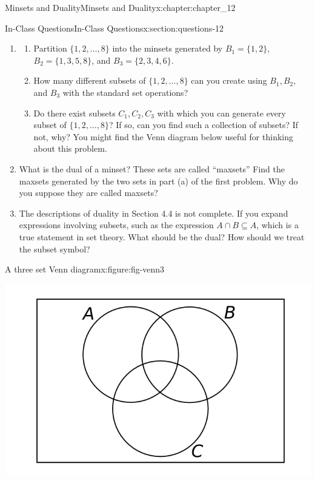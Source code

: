 \documentclass[oneside,10pt,]{book}
\numberwithin{equation}{section}
\begin{document}
\begin{chapterptx}{Minsets and Duality}{}{Minsets and Duality}{}{}{x:chapter:chapter_12}
\begin{sectionptx}{In-Class Questions}{}{In-Class Questions}{}{}{x:section:questions-12}
\begin{enumerate}[label=\arabic*.]
\begin{enumerate}[label=(\alph*)]
\item{}How does this notation make help us see how many distinct  minsets there could be that are generated by \(k\) subsets of a universe.%
\end{enumerate}
%
\item{}%
\begin{enumerate}[label=(\alph*)]
\item{}Partition \(\{1, 2,  \dots, 8\}\) into the minsets generated by \(B_1= \{1, 2\}\), \(B_2 = \{1, 3, 5, 8\}\), and \(B_3 = \{2, 3, 4, 6\}\).%
\item{}How many different subsets of \(\{1, 2, \dots ,8\}\) can you create using \(B_1, B_2\), and \(B_3\) with the standard set operations?%
\item{}Do there exist subsets \(C_1, C_2, C_3\) with which you can generate every subset of \(\{1,2, . . . ,8\}\)?  If so, can you find such a collection of subsets?  If not, why?  You might find the Venn diagram below useful for thinking about this problem.%
\end{enumerate}
%
\item{}What is the dual of a minset?  These sets are called ``maxsets''  Find the maxsets generated by the two sets in part (a) of the first problem.   Why do you suppose they are called maxsets?%
\item{}The descriptions of duality in Section 4.4 is not complete.  If you expand expressions involving subsets, such as the expression \(A \cap B \subseteq A\), which is a true statement in set theory.  What should be the dual?  How should we treat the subset symbol?%
\end{enumerate}
%
\begin{figureptx}{A three set Venn diagram}{x:figure:fig-venn3}{}%
\begin{image}{0.05}{0.9}{0.05}%
\includegraphics[width=\linewidth]{images/fig-venn3.png}
\end{image}%
\tcblower
\end{figureptx}%
\end{sectionptx}
\end{chapterptx}
\end{document}
